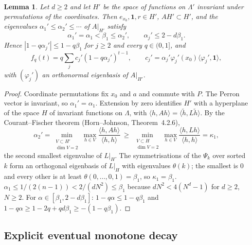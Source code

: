 \documentclass[11pt,a4paper]{article}
\newtheorem{lemma}[theorem]{Lemma}
\theoremstyle{definition}
\newcommand{\one}{\mathbf 1}
\begin{document}
\begin{lemma}\label{lem:sym}
Let $d\ge2$ and let $H'$ be the space of functions on $\Lambda'$ invariant under permutations of the coordinates. Then $e_{x_0},\one,r\in H'$, $AH'\subset H'$, and the eigenvalues $\alpha_1'\le\alpha_2'\le\cdots$ of $A|_{H'}$ satisfy
\[
\alpha_1'=\alpha_1<\beta_1\le\alpha_2',\qquad\alpha_j'\le2-d\beta_1 .
\]
Hence $|1-q\alpha_j'|\le1-q\beta_1$ for $j\ge2$ and every $q\in(0,1]$, and
\begin{equation}\label{eq:symexp}
f_q(t)=q\sum_jc_j'(1-q\alpha_j')^{t-1},\qquad c_j'=\alpha_j'\varphi_j'(x_0)\langle\varphi_j',\one\rangle,
\end{equation}
with $(\varphi_j')$ an orthonormal eigenbasis of $A|_{H'}$.
\end{lemma}
\begin{proof}
Coordinate permutations fix $x_0$ and $a$ and commute with $P$. The Perron vector is invariant, so $\alpha_1'=\alpha_1$. Extension by zero identifies $H'$ with a hyperplane of the space $H$ of invariant functions on $\Lambda$, with $\langle h,Ah\rangle=\langle\tilde h,L\tilde h\rangle$. By the Courant--Fischer theorem (Horn--Johnson, Theorem~4.2.6),
\[
\alpha_2'=\min_{\substack{V\subset H'\\ \dim V=2}}\max_{h\in V}\frac{\langle h,Ah\rangle}{\langle h,h\rangle}\ \ge\ \min_{\substack{V\subset H\\ \dim V=2}}\max_{h\in V}\frac{\langle h,Lh\rangle}{\langle h,h\rangle}=\kappa_1,
\]
the second smallest eigenvalue of $L|_H$. The symmetrisations of the $\Psi_k$ over sorted $k$ form an orthogonal eigenbasis of $L|_H$ with eigenvalues $\theta(k)$; the smallest is $0$ and every other is at least $\theta(0,\dots,0,1)=\beta_1$, so $\kappa_1=\beta_1$. $\alpha_1\le1/(2(n-1))<2/(dN^2)\le\beta_1$ because $dN^2<4(N^d-1)$ for $d\ge2$, $N\ge2$. For $\alpha\in[\beta_1,2-d\beta_1]$: $1-q\alpha\le1-q\beta_1$ and $1-q\alpha\ge1-2q+qd\beta_1\ge-(1-q\beta_1)$.
\end{proof}

\subsection{Explicit eventual monotone decay}
\end{document}
